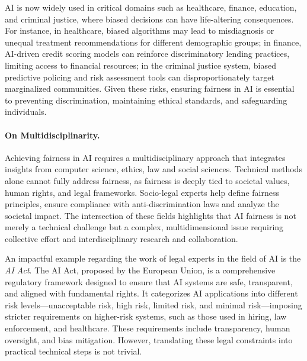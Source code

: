 \documentclass[12pt,a4paper,openright,twoside]{book}
\begin{document}

\ac{AI} is now widely used in critical domains such as healthcare, finance, education, and criminal justice, where biased decisions can have life-altering consequences.
%
For instance, in healthcare, biased algorithms may lead to misdiagnosis or unequal treatment recommendations for different demographic groups;
%
in finance, \ac{AI}-driven credit scoring models can reinforce discriminatory lending practices, limiting access to financial resources;
%
in the criminal justice system, biased predictive policing and risk assessment tools can disproportionately target marginalized communities.
%
Given these risks, ensuring fairness in \ac{AI} is essential to preventing discrimination, maintaining ethical standards, and safeguarding individuals.


\paragraph{On Multidisciplinarity.}


Achieving fairness in \ac{AI} requires a multidisciplinary approach that integrates insights from computer science, ethics, law and social sciences.
%
Technical methods alone cannot fully address fairness, as fairness is deeply tied to societal values, human rights, and legal frameworks.
%
Socio-legal experts help define fairness principles, ensure compliance with anti-discrimination laws and analyze the societal impact.
%
The intersection of these fields highlights that \ac{AI} fairness is not merely a technical challenge but a complex, multidimensional issue requiring collective effort and interdisciplinary research and collaboration.


An impactful example regarding the work of legal experts in the field of \acl{AI} is the \textit{AI Act}. 
%
The AI Act, proposed by the European Union, is a comprehensive regulatory framework designed to ensure that AI systems are safe, transparent, and aligned with fundamental rights.
%
It categorizes AI applications into different risk levels—unacceptable risk, high risk, limited risk, and minimal risk—imposing stricter requirements on higher-risk systems, such as those used in hiring, law enforcement, and healthcare.
%
These requirements include transparency, human oversight, and bias mitigation. However, translating these legal constraints into practical technical steps is not trivial. 
\end{document}

